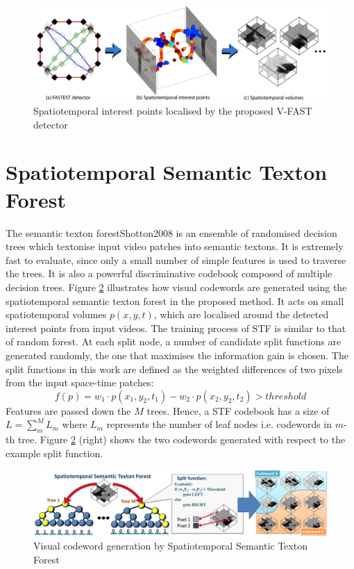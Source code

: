 \begin{figure}[ht]
\centering
\includegraphics[width=0.8\linewidth]{fig/act/fig2_tot.pdf}%
\caption{Spatiotemporal interest points localised by the proposed V-FAST detector}
\label{fig/act/fastest}
\end{figure}

\section{Spatiotemporal Semantic Texton Forest}
\label{sec/act/stf}
The semantic texton forest{Shotton2008} is an ensemble of randomised decision trees which textonise input video patches into semantic textons. It is extremely fast to evaluate, since only a small number of simple features is used to traverse the trees. It is also a powerful discriminative codebook composed of multiple decision trees. Figure \ref{fig/act/stf} illustrates how visual codewords are generated using the spatiotemporal semantic texton forest in the proposed method. It acts on small spatiotemporal volumes $p(x,y,t)$, which are localised around the detected interest points from input videos. The training process of STF is similar to that of random forest. At each split node, a number of candidate split functions are generated randomly, the one that maximises the information gain is chosen. The split functions in this work are defined as the weighted differences of two pixels from the input space-time patches: 
\begin{equation}
\mathit{f}(p) = w_1 \cdot p(x_1,y_2,t_1) - w_2 \cdot p(x_2,y_2,t_2) > threshold
\end{equation}
Features are passed down the $M$ trees. Hence, a STF codebook has a size of $L=\sum_m^M L_m$  where $L_m$ represents the number of leaf nodes i.e. codewords in $m$-th tree. Figure \ref{fig/act/stf} (right) shows the two codewords generated with respect to the example split function.
\begin{figure}[ht]
\includegraphics[width=1\linewidth]{fig/act/stf.pdf}%
\caption{Visual codeword generation by Spatiotemporal Semantic Texton Forest}
\label{fig/act/stf}
\end{figure}
